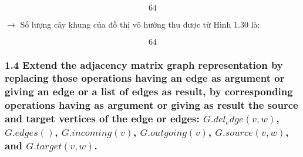\documentclass{article}
\begin{document}
	\[
	\boxed{64}
	\]
	
	\vspace{1em}
	$\rightarrow$ Số lượng cây khung của đồ thị vô hướng thu được từ Hình 1.30 là:
	
	\[
	\boxed{64}
	\]
	
	\subsubsection*{1.4 Extend the adjacency matrix graph representation by replacing those operations having an edge as argument or giving an edge or a list of edges as result, by corresponding operations having as argument or giving as result the source and target vertices of the edge or edges: $G.del_edge(v,w)$, $G.edges()$, $G.incoming(v)$, $G.outgoing(v)$, $G.source(v,w)$, and $G.target(v,w)$.}
	
\end{document}
